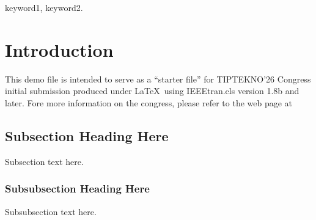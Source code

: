 \documentclass[conference, a4paper]{IEEEtran}
\begin{document}




\maketitle

\begin{abstract}
The abstract of Tiptekno-2026 paper goes here.\\
\end{abstract}

\begin{IEEEkeywords}
keyword1, keyword2.
\end{IEEEkeywords}




%


\section{Introduction}
This demo file is intended to serve as a ``starter file''
for TIPTEKNO'26 Congress initial submission produced under \LaTeX\ using
IEEEtran.cls version 1.8b and later. Fore more information on the congress,
please refer to the web page at  \\ 


\IEEEpubidadjcol

\subsection{Subsection Heading Here}
Subsection text here.


\subsubsection{Subsubsection Heading Here}
Subsubsection text here.
\end{document}
